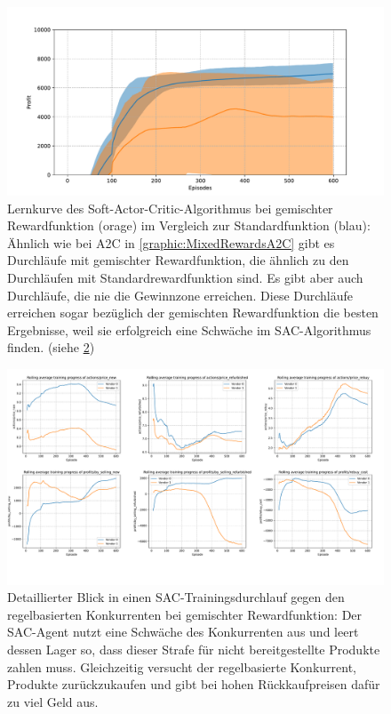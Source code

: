 \begin{figure}[htb]
	\centering
	\includegraphics[width=\textwidth]{appendix/mixed_rewards_sac.pdf}
	\caption{
		Lernkurve des Soft-Actor-Critic-Algorithmus bei gemischter Rewardfunktion (orage) im Vergleich zur Standardfunktion (blau):
		Ähnlich wie bei A2C in \ref{graphic:MixedRewardsA2C} gibt es Durchläufe mit gemischter Rewardfunktion, die ähnlich zu den Durchläufen mit Standardrewardfunktion sind.
		Es gibt aber auch Durchläufe, die nie die Gewinnzone erreichen.
		Diese Durchläufe erreichen sogar bezüglich der gemischten Rewardfunktion die besten Ergebnisse, weil sie erfolgreich eine Schwäche im SAC-Algorithmus finden. (siehe \ref{graphic:ExplanationUnnormalSAC})
	}
	\label{graphic:MixedRewardsSAC}
\end{figure}
\begin{figure}[htb]
	\centering
	\includegraphics[width=\textwidth]{appendix/explanation_unnormal_sac.pdf}
	\caption{
		Detaillierter Blick in einen SAC-Trainingsdurchlauf gegen den regelbasierten Konkurrenten bei gemischter Rewardfunktion:
		Der SAC-Agent nutzt eine Schwäche des Konkurrenten aus und leert dessen Lager so, dass dieser Strafe für nicht bereitgestellte Produkte zahlen muss.
		Gleichzeitig versucht der regelbasierte Konkurrent, Produkte zurückzukaufen und gibt bei hohen Rückkaufpreisen dafür zu viel Geld aus.
	}
	\label{graphic:ExplanationUnnormalSAC}
\end{figure}
